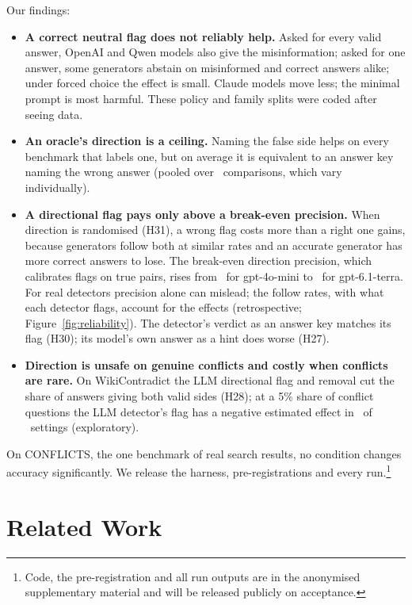 Our findings:
\begin{itemize}[leftmargin=*,itemsep=1pt,topsep=2pt]
\item \textbf{A correct neutral flag does not reliably help.} Asked for every valid answer, OpenAI and Qwen models also give the
misinformation; asked for one answer, some generators abstain on misinformed and correct answers
alike; under forced choice the effect is small. Claude models move less; the minimal prompt is most harmful.
These policy and family splits were coded after seeing data.
\item \textbf{An oracle's direction is a ceiling.} Naming the false side helps on every benchmark that labels one, but
on average it is equivalent to an answer key naming the wrong answer (pooled over \PoolTwentyThreeK\
comparisons, which vary individually).
\item \textbf{A directional flag pays only above a break-even precision.} When direction is randomised (H31), a wrong
flag costs more than a right one gains, because generators follow both at similar rates and an accurate generator has
more correct answers to lose. The break-even direction precision, which calibrates flags on true pairs, rises from \beMin\ for gpt-4o-mini to
\beMax\ for gpt-6.1-terra. For real detectors precision alone can mislead; the follow rates, with
what each detector flags, account for the effects (retrospective; Figure~\ref{fig:reliability}). The detector's verdict as an answer key matches its flag (H30); its model's
own answer as a hint does worse (H27).
\item \textbf{Direction is unsafe on genuine conflicts and costly when conflicts are rare.} On WikiContradict the LLM
directional flag and removal cut the share of answers giving both valid sides (H28); at a 5\% share of conflict
questions the LLM detector's flag has a negative estimated effect in \prevNegFive\ of \prevN\ settings (exploratory).
\end{itemize}
On CONFLICTS, the one benchmark of real search results, no condition changes accuracy significantly. We release the harness, pre-registrations and every run.\footnote{Code, the pre-registration and
all run outputs are in the anonymised supplementary material and will be released publicly on acceptance.}
\section{Related Work}
\label{sec:related}

